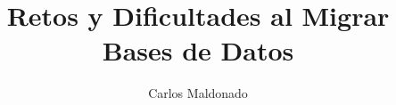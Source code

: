 

\title[DataBase] {Retos y Dificultades al Migrar Bases de Datos}
\author[cmaldonado@covetel.com.ve]{ Carlos Maldonado }
\subtitle{}



\begin{frame} %
    \maketitle 
\end{frame}

\begin{frame} %
    \tableofcontents
\end{frame}


